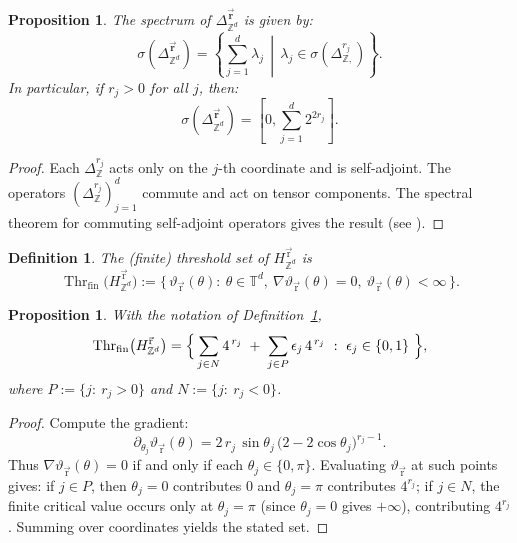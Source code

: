 \documentclass[10pt]{amsart} %
\newcommand{\T}{{\mathbb{T}}}
\newcommand{\Z}{{\mathbb{Z}}}
\newcommand{\1}{{\mathbb{I}}}
\newcommand{\Thr}{\operatorname{Thr}}
\numberwithin{equation}{section}
\newtheorem{proposition}[theorem]{Proposition}%
\newtheorem{definition}[theorem]{Definition}%
\begin{document}
\begin{proposition}\label{prop:spect}
The spectrum of $\Delta_{\mathbb{Z}^d}^{\vec{\mathbf{r}}}$ is given by:
\[
\sigma\left( \Delta_{\mathbb{Z}^d}^{\vec{\mathbf{r}}} \right) = \left\{ \sum_{j=1}^d \lambda_j \,\middle|\, \lambda_j \in \sigma\left( \Delta_{\mathbb{Z},}^{r_j} \right) \right\}.
\]
In particular, if $r_j > 0$ for all $j$, then:
\[
\sigma\left( \Delta_{\mathbb{Z}^d}^{\vec{\mathbf{r}}} \right) = \left[ 0, \sum_{j=1}^d 2^{2r_j} \right].
\]
\end{proposition}


\begin{proof}
Each \(\Delta^{r_j}_{\mathbb{Z}}\) acts only on the \(j\)-th coordinate and is self-adjoint. The operators \((\Delta^{r_j}_{\mathbb{Z}})_{j=1}^d\) commute and act on tensor components. The spectral theorem for commuting self-adjoint operators gives the result (see \cite{Da,Da1}).
\end{proof}
\begin{definition}\label{2.11}
The (finite) threshold set of $H_{\Z^d}^{\vec{\mathrm r}}$ is
\[
\Thr_{\mathrm{fin}}\!\big(H_{\Z^d}^{\vec{\mathrm r}}\big)
:=\bigl\{\,\vartheta_{\vec{\mathrm r}}(\theta):\ \theta\in\T^d,\ \nabla \vartheta_{\vec{\mathrm r}}(\theta)=0,\ \vartheta_{\vec{\mathrm r}}(\theta)<\infty\,\bigr\}.
\]
\end{definition}

\begin{proposition}\label{prop:thresholds-mixed}
With the notation of Definition~\ref{2.11},
\[
\Thr_{\mathrm{fin}}\!\big(H_{\Z^d}^{\vec{\mathrm r}}\big)
=\Bigl\{\, \sum_{j\in N}4^{\,r_j}\;+\;\sum_{j\in P}\epsilon_j\,4^{\,r_j}\ :\ \epsilon_j\in\{0,1\}\ \Bigr\},
\]
where $P:=\{j:\ r_j>0\}$ and $N:=\{j:\ r_j<0\}$.
\end{proposition}

\begin{proof}
Compute the gradient:
\[
\partial_{\theta_j} \vartheta_{\vec{\mathrm r}}(\theta)=2\,r_j\,\sin \theta_j\,\bigl(2-2\cos \theta_j\bigr)^{r_j-1}.
\]
Thus $\nabla \vartheta_{\vec{\mathrm r}}(\theta)=0$ if and only if each $\theta_j\in\{0,\pi\}$. Evaluating $\vartheta_{\vec{\mathrm r}}$ at such points gives:
if $j\in P$, then $\theta_j=0$ contributes $0$ and $\theta_j=\pi$ contributes $4^{r_j}$; if $j\in N$, the finite critical value occurs only at $\theta_j=\pi$ (since $\theta_j=0$ gives $+\infty$), contributing $4^{r_j}$. Summing over coordinates yields the stated set.
\end{proof}
\end{document}
